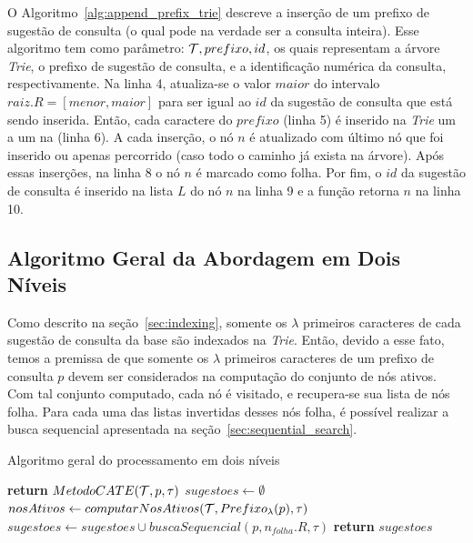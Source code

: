 O Algoritmo~\ref{alg:append_prefix_trie} descreve a inserção de um prefixo de sugestão de consulta (o qual pode na verdade ser a consulta inteira). Esse algoritmo tem como parâmetro: $\mathcal{T}, prefixo, id$, os quais representam a árvore \textit{Trie}, o prefixo de sugestão de consulta, e a identificação numérica da consulta, respectivamente. Na linha 4, atualiza-se o valor $maior$ do intervalo $raiz.R = [menor, maior]$ para ser igual ao $id$ da sugestão de consulta que está sendo inserida. Então, cada caractere do $prefixo$ (linha 5) é inserido na \textit{Trie} um a um na (linha 6). A cada inserção, o nó $n$ é atualizado com último nó que foi inserido ou apenas percorrido (caso todo o caminho já exista na árvore). Após essas inserções, na linha 8 o nó $n$ é marcado como folha. Por fim, o $id$ da sugestão de consulta é inserido na lista $L$ do nó $n$ na linha 9 e a função retorna $n$ na linha 10. 

\subsection{Algoritmo Geral da Abordagem em Dois Níveis}
\label{sec:general_two_level_algorithm}
Como descrito na seção~\ref{sec:indexing}, somente os $\lambda$ primeiros caracteres de cada sugestão de consulta da base são indexados na \textit{Trie}. Então, devido a esse fato, temos a premissa de que somente os $\lambda$ primeiros caracteres de um prefixo de consulta $p$ devem ser considerados na computação do conjunto de nós ativos. Com tal conjunto computado, cada nó é visitado, e recupera-se sua lista de nós folha. Para cada uma das listas invertidas desses nós folha, é possível realizar a busca sequencial apresentada na seção~\ref{sec:sequential_search}. 

\begin{algorithm}[H]
\caption{Algoritmo geral do processamento em dois níveis}\label{alg:general_two_level}
\begin{algorithmic}[1]
     \textbf{return} $MetodoCATE(\mathcal{T},p,\tau)$
    \EndIf
    \State $sugestoes \leftarrow \emptyset$
    \State $nosAtivos \leftarrow computarNosAtivos(\mathcal{T}, Prefixo_{\lambda}(p), \tau)$ 
     
            \State $sugestoes \leftarrow sugestoes \cup buscaSequencial(p, n_{folha}.R, \tau)$
        \EndFor
    \EndFor
    \State \textbf{return} $sugestoes$
\EndFunction
\end{algorithmic}
\end{algorithm}

